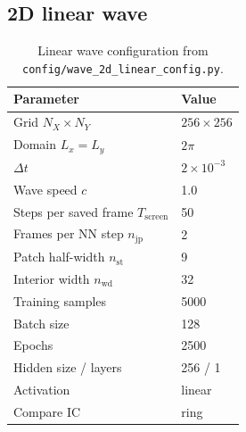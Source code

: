 ﻿\documentclass[11pt,a4paper]{article}
\begin{document}
\subsection{2D linear wave}
\begin{table}[H]
  \centering
  \caption{Linear wave configuration from \texttt{config/wave\_2d\_linear\_config.py}.}
  \begin{tabular}{ll}
    \toprule
    Parameter & Value \\
    \midrule
    Grid $N_X\times N_Y$ & $256\times256$ \\
    Domain $L_x=L_y$ & $2\pi$ \\
    $\Delta t$ & $2\times 10^{-3}$ \\
    Wave speed $c$ & 1.0 \\
    Steps per saved frame $T_{\mathrm{screen}}$ & 50 \\
    Frames per NN step $n_{\mathrm{jp}}$ & 2 \\
    Patch half-width $n_{\mathrm{st}}$ & 9 \\
    Interior width $n_{\mathrm{wd}}$ & 32 \\
    Training samples & 5000 \\
    Batch size & 128 \\
    Epochs & 2500 \\
    Hidden size / layers & 256 / 1 \\
    Activation & linear \\
    Compare IC & ring \\
    \bottomrule
  \end{tabular}
\end{table}
\end{document}
